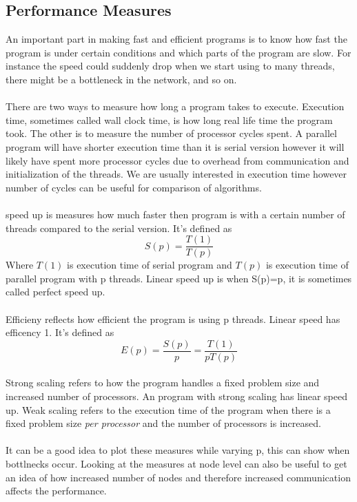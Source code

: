 \documentclass[10pt,a4paper]{report}
\begin{document}
\subsection{Performance Measures}
An important part in making fast and efficient programs is to know how fast the program is under certain conditions and which parts of the program are slow. For instance the speed could suddenly drop when we start using to many threads, there might be a bottleneck in the network, and so on.\\
\\
There are two ways to measure how long a program takes to execute. Execution time, sometimes called wall clock time, is how long real life time the program took. The other is to measure the number of processor cycles spent. A parallel program will have shorter execution time than it is serial version however it will likely have spent more processor cycles due to overhead from communication and initialization of the threads. We are usually interested in execution time however number of cycles can be useful for comparison of algorithms.\\
\\
speed up is measures how much faster then program is with a certain number of threads compared to the serial version. It's defined as
$$S(p)=\frac{T(1)}{T(p)}$$
Where $T(1)$ is execution time of serial program and $T(p)$ is execution time of parallel program with p threads. Linear speed up is when S(p)=p, it is sometimes called perfect speed up.\\
\\
Efficieny reflects how efficient the program is using p threads. Linear speed has efficency 1. It's defined as
$$E(p)=\frac{S(p)}{p}=\frac{T(1)}{pT(p)}$$
\\
Strong scaling refers to how the program handles a fixed problem size and increased number of processors. An program with strong scaling has linear speed up. Weak scaling refers to the execution time of the program when there is a fixed problem size \emph{per processor} and the number of processors is increased.\cite{cuda_best_practice}\\
\\
It can be a good idea to plot these measures while varying p, this can show when bottlnecks occur. Looking at the measures at node level can also be useful to get an idea of how increased number of nodes and therefore increased communication affects the performance.
\end{document}
